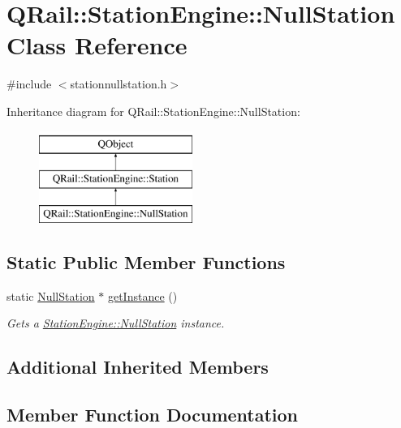 \hypertarget{classQRail_1_1StationEngine_1_1NullStation}{}\section{Q\+Rail\+::Station\+Engine\+::Null\+Station Class Reference}
\label{classQRail_1_1StationEngine_1_1NullStation}


{\ttfamily \#include $<$stationnullstation.\+h$>$}

Inheritance diagram for Q\+Rail\+::Station\+Engine\+::Null\+Station\+:\begin{figure}[H]
\begin{center}
\leavevmode
\includegraphics[height=3.000000cm]{classQRail_1_1StationEngine_1_1NullStation}
\end{center}
\end{figure}
\subsection*{Static Public Member Functions}
\begin{DoxyCompactItemize}
\item 
static \mbox{\hyperlink{classQRail_1_1StationEngine_1_1NullStation}{Null\+Station}} $\ast$ \mbox{\hyperlink{classQRail_1_1StationEngine_1_1NullStation_a620d1cc84bf91ad1c2cadf1f810c9832}{get\+Instance}} ()
\begin{DoxyCompactList}\small\item\em Gets a \mbox{\hyperlink{classQRail_1_1StationEngine_1_1NullStation}{Station\+Engine\+::\+Null\+Station}} instance. \end{DoxyCompactList}\end{DoxyCompactItemize}
\subsection*{Additional Inherited Members}


\subsection{Member Function Documentation}
\mbox{\label{classQRail_1_1StationEngine_1_1NullStation_a620d1cc84bf91ad1c2cadf1f810c9832}} 
